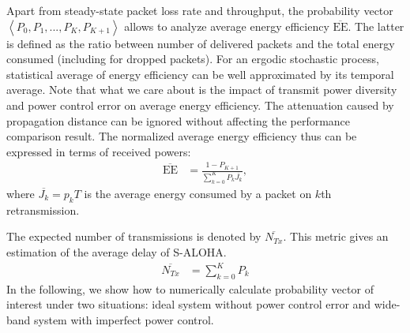 Apart from steady-state packet loss rate and throughput, the probability vector $\left\langle P_0, P_1, ..., P_K, P_{K+1}\right\rangle$ allows to analyze average energy efficiency $\overline{\text{EE}}$. The latter is defined as the ratio between number of delivered packets and the total energy consumed (including for dropped packets). For an ergodic stochastic process, statistical average of energy efficiency can be well approximated by its temporal average. Note that what we care about is the impact of transmit power diversity and power control error on average energy efficiency. The attenuation caused by propagation distance can be ignored without affecting the performance comparison result. The normalized average energy efficiency thus can be expressed in terms of received powers:
\begin{align}
\overline{\text{EE}} &= \frac{1-P_{K+1}}{\sum_{k=0}^{K} P_{k}\overline{J_k}},
\end{align}
where $\overline{J_k} = p_k T$ is the average energy consumed by a packet on $k$th retransmission. 

The expected number of transmissions is denoted by $\overline{N_{Tx}}$. This metric gives an estimation of the average delay of S-ALOHA.
\begin{align*}
\overline{N_{Tx}} &= \sum_{k=0}^{K} P_{k} 
\end{align*}
In the following, we show how to numerically calculate probability vector of interest under two situations: ideal system without power control error and wide-band system with imperfect power control.